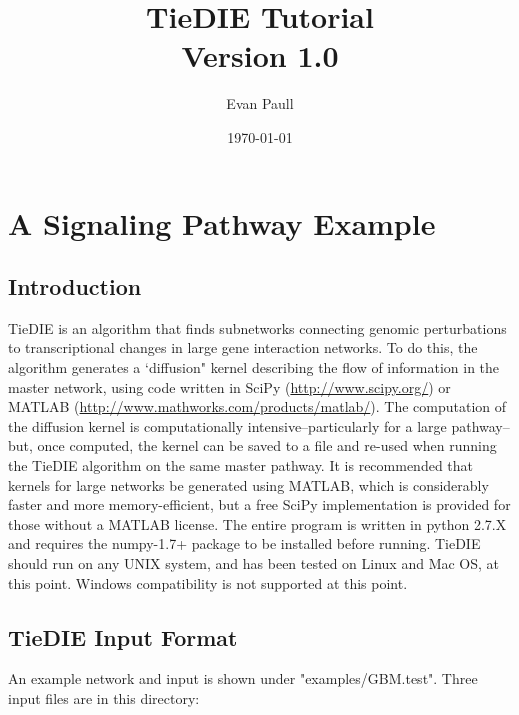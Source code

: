 \documentclass[11pt]{report}
\author{Evan Paull \emailaddr{epaull@soe.ucsc.edu}}
\title{TieDIE Tutorial \\ Version 1.0}
\date{\today}
\begin{document}
\maketitle

\tableofcontents

\singlespace

\chapter{A Signaling Pathway Example}

\section{Introduction}

\noindent TieDIE is an algorithm that finds subnetworks connecting genomic perturbations to transcriptional changes in 
large gene interaction networks. To do this, the algorithm generates a `diffusion" kernel describing
the flow of information in the master network, using code written in SciPy (\url{http://www.scipy.org/}) or 
 MATLAB (\url{http://www.mathworks.com/products/matlab/}). The computation of the diffusion kernel is computationally
intensive--particularly for a large pathway--but, once computed, the kernel can be saved to a file and re-used
when running the TieDIE algorithm on the same master pathway. It is recommended that kernels for large networks
be generated using MATLAB, which is considerably faster and more memory-efficient, but a free SciPy implementation is 
provided for those without a MATLAB license. The entire program is written in python 2.7.X and requires the numpy-1.7+
package to be installed before running. TieDIE should run on any UNIX system, and has been tested on Linux and Mac OS, at this 
point. Windows compatibility is not supported at this point. 

\section{TieDIE Input Format}

\noindent An example network and input is shown under "examples/GBM.test". Three input files are in this directory: 
\end{document}
